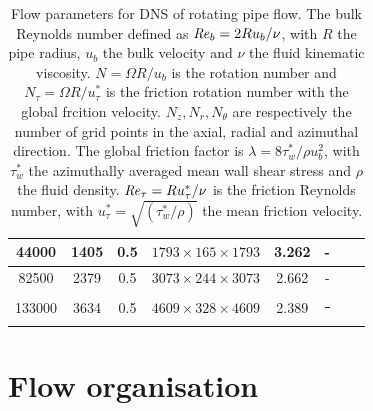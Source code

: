 \documentclass[lineno]{jfm}
\begin{document}
\begin{table}
\begin{center}
\begin{tabular}{cccccccc}
	 			\midrule
	 			44000  & 1405  & 0.5  & $1793 \times 165 \times 1793$ & 3.262& -\\
	 			\midrule
	 			82500  & 2379  & 0.5  & $3073 \times 244 \times 3073$ & 2.662& -\\
	 			\midrule
	 			133000 & 3634  & 0.5  & $4609 \times 328 \times 4609$ & 2.389& \textcolor{black}{\rule{0.05\linewidth}{0.75mm}}\\
	 			\bottomrule
	 		\end{tabular}
	 		\caption{Flow parameters for DNS of rotating pipe flow.
	 			The bulk Reynolds number defined as $\mbox{\textit{Re}}_b = 2 R u_b/\nu$, with $R$ 
	 			the pipe radius, $u_b$ the bulk velocity and 
	 			$\nu$ the fluid kinematic viscosity.
	 			$N = \Omega R/u_b$ is the rotation number 
	 			and $N_\tau = \Omega R/u^*_{\tau}$ is the friction rotation number
	 			with the global frcition velocity.
	 			$N_z, N_r, N_\theta$ are respectively the number of grid points in the axial,
	 			radial and azimuthal direction.
	 			The global friction factor is $\lambda = 8 \tau_w^* / \rho u_b^2$, with
	 			$\tau_w^*$ the azimuthally averaged mean wall shear stress and $\rho$ the fluid density.
	 			$\mbox{\textit{Re}}_{\tau} = R u^*_{\tau} / \nu$ is the friction Reynolds number,
	 			with $u^*_{\tau} = \sqrt{(\tau_w^*/\rho)}$ the mean friction velocity.
	 		} 
	 		\label{tab:runs} 
	 		\end{center}
 		\end{table}
	 
	\section{Flow organisation} \label{sec:flow}
\end{document}
